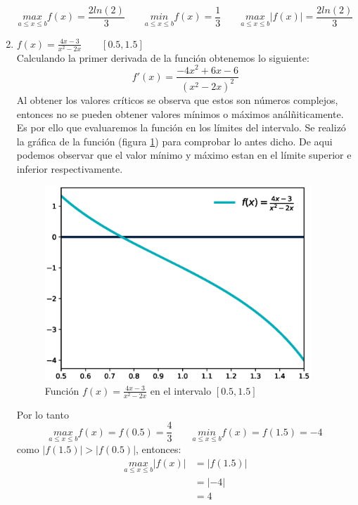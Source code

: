 \begin{enumerate}
          \begin{equation*}
              \underset{a\leq x\leq b}{max} f(x)= \frac{2ln(2)}{3} \qquad
              \underset{a\leq x\leq b}{min} f(x) = \frac{1}{3}\qquad
              \underset{a\leq x\leq b}{max} |f(x)| = \frac{2ln(2)}{3}
          \end{equation*}
    \item $f(x)= \frac{4x-3}{x^2-2x} \qquad [0.5,1.5]$\\
          Calculando la primer derivada de la función obtenemos lo siguiente:
          \begin{equation*}
              f'(x)= \frac{-4x^2+6x-6}{(x^2-2x)^2}
          \end{equation*}
          Al obtener los valores críticos se observa que estos son números complejos, entonces no se pueden obtener valores mínimos o máximos análñiticamente. Es por ello que evaluaremos la función en los límites del intervalo. Se realizó la gráfica de la función (figura \ref{fig:problema2b}) para comprobar lo antes dicho. De aqui podemos observar que el valor mínimo y máximo estan en el límite superior e inferior respectivamente.
          \begin{figure}[H]
              \centering
              \includegraphics[width=10cm]{Graphics/function_4.eps}
              \caption{Función $f(x)= \frac{4x-3}{x^2-2x}$ en el intervalo $[0.5,1.5]$}
              \label{fig:problema2b}
          \end{figure}
          Por lo tanto
          \begin{equation*}
              \underset{a\leq x\leq b}{max} f(x)= f(0.5)=\frac{4}{3} \qquad
              \underset{a\leq x\leq b}{min} f(x) = f(1.5)=-4
          \end{equation*}
          como $|f(1.5)|>|f(0.5)|$, entonces:
          \begin{align*}
              \underset{a\leq x\leq b}{max} |f(x)| & =|f(1.5)| \\
                                                   & =|-4|     \\
                                                   & =4
          \end{align*}
\end{enumerate}